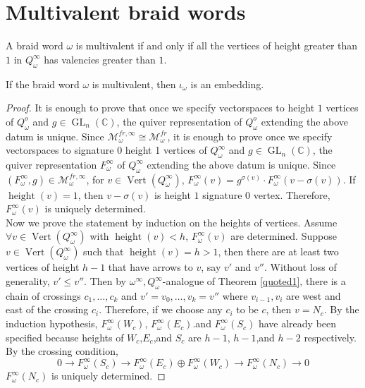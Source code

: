 \section{Multivalent braid words}                            
\begin{definition}\label{Sibuya}
 A braid word $\omega$ is multivalent if and only if all the vertices of height greater than $1$ in $Q^\infty_\omega$ has valencies greater than $1$.
\end{definition}

\begin{theorem}
	If the braid word $\omega$ is multivalent, then $\iota_{\omega}$ is an embedding.
\end{theorem}
\begin{proof}
It is enough to prove that once we specify vectorspaces to height $1$ vertices of $Q^o_\omega$ and $g\in \operatorname{GL}_n(\mathbb{C})$, the quiver representation of $Q^o_\omega$ extending the above datum is unique. Since $\mathcal{M}_\omega^{fr,\infty}\cong \mathcal{M}_\omega^{fr}$, it is enough to prove once we specify vectorspaces to signature 0 height 1 vertices of $Q_\omega^\infty$ and $g\in \operatorname{GL}_n(\mathbb{C})$, the quiver representation $F_\omega^\infty$ of $Q_\omega^\infty$ extending the above datum is unique. Since $(F_\omega^\infty,g)\in \mathcal{M}_\omega^{fr,\infty}$, for $v\in \operatorname{Vert}(Q_\omega^\infty)$, $F_\omega^\infty(v) = g^{\sigma(v)}\cdot F_\omega^\infty(v-\sigma(v))$. If $\operatorname{height}(v)=1$, then $v-\sigma(v)$ is height $1$ signature $0$ vertex. Therefore, $F_\omega^\infty(v)$ is uniquely determined. \\
Now we prove the statement by induction on the heights of vertices. Assume $\forall v\in \operatorname{Vert}(Q_\omega^\infty)$ with $\operatorname{height}(v)<h$, $F_\omega^\infty(v)$ are determined. Suppose $v\in \operatorname{Vert}(Q_\omega^\infty)$ such that $\operatorname{height}(v)=h>1$, then there are at least two vertices of height $h-1$ that have arrows to $v$, say $v'$ and $v''$. Without loss of generality, $v'\leq v''$. Then by $\omega^\infty,Q_\omega^\infty$-analogue of Theorem \ref{quoted1}, there is a chain of crossings $c_1,\dots,c_k$ and $v'=v_0,\dots,v_k=v''$ where $v_{i-1},v_i$ are west and east of the crossing $c_i$. Therefore, if we choose any $c_i$ to be $c$, then $v=N_c$. By the induction hypothesis, $F_\omega^\infty(W_c)$, $F_\omega^\infty(E_c)$.and $F_\omega^\infty(S_c)$ have already been specified because heights of $W_c$,$E_c$,and $S_c$ are $h-1$, $h-1$,and $h-2$ respectively. By the crossing condition,
\[
0\rightarrow F_\omega^\infty(S_c)\rightarrow F_\omega^\infty(E_c)\oplus F_\omega^\infty(W_c) \rightarrow F_\omega^\infty(N_c)\rightarrow 0
\]
$F_\omega^\infty(N_c)$ is uniquely determined.
\end{proof}

